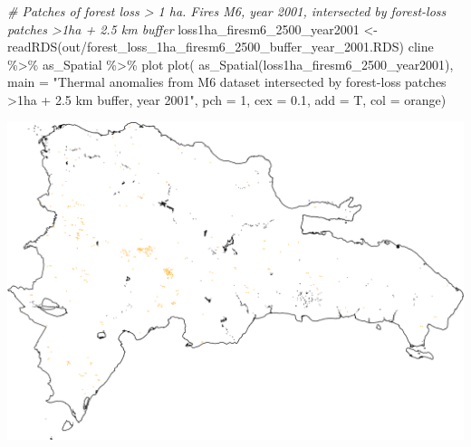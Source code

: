 \documentclass[10pt,landscape,a3paper]{article}
\newenvironment{Shaded}{\begin{snugshade}}{\end{snugshade}}
\newcommand{\AttributeTok}[1]{\textcolor[rgb]{0.77,0.63,0.00}{#1}}
\newcommand{\CommentTok}[1]{\textcolor[rgb]{0.56,0.35,0.01}{\textit{#1}}}
\newcommand{\DecValTok}[1]{\textcolor[rgb]{0.00,0.00,0.81}{#1}}
\newcommand{\FloatTok}[1]{\textcolor[rgb]{0.00,0.00,0.81}{#1}}
\newcommand{\FunctionTok}[1]{\textcolor[rgb]{0.00,0.00,0.00}{#1}}
\newcommand{\NormalTok}[1]{#1}
\newcommand{\OtherTok}[1]{\textcolor[rgb]{0.56,0.35,0.01}{#1}}
\newcommand{\SpecialCharTok}[1]{\textcolor[rgb]{0.00,0.00,0.00}{#1}}
\newcommand{\StringTok}[1]{\textcolor[rgb]{0.31,0.60,0.02}{#1}}
\begin{document}
\begin{Shaded}
\begin{Highlighting}[]
\CommentTok{\# Patches of forest loss \textgreater{} 1 ha. Fires M6, year 2001, intersected by forest{-}loss patches \textgreater{}1ha + 2.5 km buffer}
\NormalTok{loss1ha\_firesm6\_2500\_year2001 }\OtherTok{\textless{}{-}} \FunctionTok{readRDS}\NormalTok{(}\StringTok{\textquotesingle{}out/forest\_loss\_1ha\_firesm6\_2500\_buffer\_year\_2001.RDS\textquotesingle{}}\NormalTok{)}
\NormalTok{cline }\SpecialCharTok{\%\textgreater{}\%}\NormalTok{ as\_Spatial }\SpecialCharTok{\%\textgreater{}\%}\NormalTok{ plot}
\FunctionTok{plot}\NormalTok{(}
  \FunctionTok{as\_Spatial}\NormalTok{(loss1ha\_firesm6\_2500\_year2001),}
  \AttributeTok{main =} \StringTok{"Thermal anomalies from M6 dataset intersected by forest{-}loss patches \textgreater{}1ha + 2.5 km buffer, year 2001"}\NormalTok{,}
  \AttributeTok{pch =} \DecValTok{1}\NormalTok{, }\AttributeTok{cex =} \FloatTok{0.1}\NormalTok{, }\AttributeTok{add =}\NormalTok{ T, }\AttributeTok{col =} \StringTok{\textquotesingle{}orange\textquotesingle{}}\NormalTok{)}
\end{Highlighting}
\end{Shaded}

\begin{center}\includegraphics{img/data-download-preparation-eda/fires-m6-v1-sel-2500km-buffer-1} \end{center}
\end{document}
